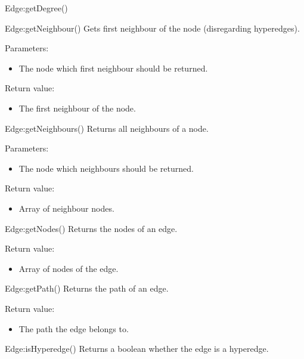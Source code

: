 \begin{luacommand}{{Edge:getDegree}()}
\end{luacommand}\begin{luacommand}{{Edge:getNeighbour}()}
Gets first neighbour of the node (disregarding hyperedges).

Parameters:
\begin{itemize}
	\item[]  \subitem The node which first neighbour should be returned.
\end{itemize}


Return value:
\begin{itemize} \item[] The first neighbour of the node. \end{itemize}


\end{luacommand}\begin{luacommand}{{Edge:getNeighbours}()}
Returns all neighbours of a node.

Parameters:
\begin{itemize}
	\item[]  \subitem The node which neighbours should be returned.
\end{itemize}


Return value:
\begin{itemize} \item[] Array of neighbour nodes. \end{itemize}


\end{luacommand}\begin{luacommand}{{Edge:getNodes}()}
Returns the nodes of an edge.


Return value:
\begin{itemize} \item[] Array of nodes of the edge. \end{itemize}


\end{luacommand}\begin{luacommand}{{Edge:getPath}()}
Returns the path of an edge.


Return value:
\begin{itemize} \item[] The path the edge belongs to. \end{itemize}


\end{luacommand}\begin{luacommand}{{Edge:isHyperedge}()}
Returns a boolean whether the edge is a hyperedge.



\end{luacommand}
